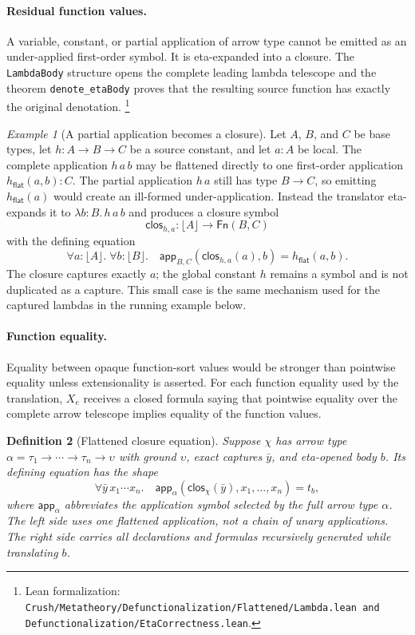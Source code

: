 \documentclass[11pt]{article}
\newtheorem{definition}{Definition}[section]
\theoremstyle{remark}
\newtheorem{example}[definition]{Example}
\newcommand{\leanfiles}[1]{\footnote{Lean formalization: \texttt{Crush/Metatheory/#1}.}}
\newcommand{\Fn}{\mathsf{Fn}}
\newcommand{\clos}{\mathsf{clos}}
\newcommand{\app}{\mathsf{app}}
\newcommand{\erase}[1]{\lfloor #1\rfloor}
\begin{document}
\paragraph{Residual function values.}
A variable, constant, or partial application of arrow type cannot be emitted as
an under-applied first-order symbol. It is eta-expanded into a closure. The
\texttt{LambdaBody} structure opens the complete leading lambda telescope and
the theorem \texttt{denote\_etaBody} proves that the resulting source function
has exactly the original denotation.
\leanfiles{Defunctionalization/Flattened/Lambda.lean and Defunctionalization/EtaCorrectness.lean}

\begin{example}[A partial application becomes a closure]
Let $A$, $B$, and $C$ be base types, let $h:A\to B\to C$ be a source
constant, and let $a:A$ be local. The complete application $h\,a\,b$ may be
flattened directly to one first-order application
$h_{\mathsf{flat}}(a,b):C$. The partial application $h\,a$ still has type
$B\to C$, so emitting $h_{\mathsf{flat}}(a)$ would create an ill-formed
under-application. Instead the translator eta-expands it to
$\lambda b{:}B.\,h\,a\,b$ and produces a closure symbol
\[
 \clos_{h,a}:\erase A\longrightarrow\Fn(B,C)
\]
with the defining equation
\[
 \forall a{:}\erase A.\;\forall b{:}\erase B.\quad
 \app_{B,C}(\clos_{h,a}(a),b)=h_{\mathsf{flat}}(a,b).
\]
The closure captures exactly $a$; the global constant $h$ remains a symbol and
is not duplicated as a capture. This small case is the same mechanism used for
the captured lambdas in the running example below.
\end{example}

\paragraph{Function equality.}
Equality between opaque function-sort values would be stronger than pointwise
equality unless extensionality is asserted. For each function equality used by
the translation, $X_e$ receives a closed formula saying that pointwise equality
over the complete arrow telescope implies equality of the function values.

\begin{definition}[Flattened closure equation]
Suppose $\chi$ has arrow type
$\alpha=\tau_1\to\cdots\to\tau_n\to\upsilon$ with ground $\upsilon$, exact captures
$\bar y$, and eta-opened body $b$. Its defining equation has the shape
\[
 \forall\bar y\,x_1\cdots x_n.\quad
 \app_{\alpha}(\clos_\chi(\bar y),x_1,\ldots,x_n)=t_b,
\]
where $\app_\alpha$ abbreviates the application symbol selected by the full
arrow type $\alpha$.
The left side uses one flattened application, not a chain of unary applications.
The right side carries all declarations and formulas recursively generated
while translating $b$.
\end{definition}
\end{document}
